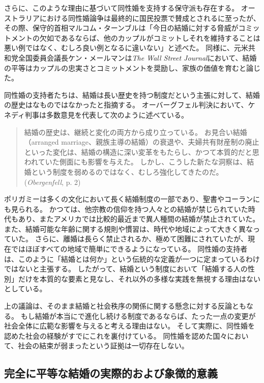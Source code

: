 \documentclass[paper=a4,book,openany]{jlreq} \usepackage{mystyle}
\begin{document}
さらに、このような理由に基づいて同性婚を支持する保守派も存在する。
オーストラリアにおける同性婚論争は最終的に国民投票で賛成とされるに至ったが、その際、保守的首相マルコム・ターンブルは「今日の結婚に対する脅威がコミットメントの欠如であるならば、他のカップルがコミットしそれを維持することは悪い例ではなく、むしろ良い例となるに違いない」と述べた\citep{gartrell17:_malcol_turnb_makes_conser_case}。
同様に、元米共和党全国委員会議長ケン・メールマンは\emph{The Wall Street Journal}において、結婚の平等はカップルの忠実さとコミットメントを奨励し、家族の価値を育むと論じた\citep{mehlman12:_makin_same_sex_case}。

同性婚の支持者たちは、結婚は長い歴史を持つ制度だという主張に対して、結婚の歴史はなものではなかったと指摘する。
オーバーグフェル判決において、ケネディ判事は多数意見を代表して次のように述べている。

\begin{quote}
結婚の歴史は、継続と変化の両方から成り立っている。
お見合い結婚（arranged marriage、親族主導の結婚）の衰退や、夫婦共有財産制の廃止といった変化は、結婚の構造に深い変革をもたらし、かつて本質的だと思われていた側面にも影響を与えた。
しかし、こうした新たな洞察は、結婚という制度を弱めるのではなく、むしろ強化してきたのだ。
(\emph{Obergenfell}, p. 2)
\end{quote}

ポリガミーは多くの文化において長く結婚制度の一部であり、聖書やコーランにも見られる。
かつては、他宗教の信仰を持つ人々との結婚が禁じられていた時代もあり、またアメリカでは比較的最近まで異人種間の結婚が禁止されていた。
また、結婚可能な年齢に関する規則や慣習は、時代や地域によって大きく異なっていた。
さらに、離婚は長らく禁止されるか、極めて困難にされていたが、現在ではほぼすべての地域で簡単にできるようになっている。
同性婚の支持者は、このように「結婚とは何か」という伝統的な定義が一つに定まっているわけではないと主張する。
したがって、結婚という制度において「結婚する人の性別」だけを本質的な要素と見なし、それ以外の多様な実践を無視する理由はないとしている。

上の議論は、そのまま結婚と社会秩序の関係に関する懸念に対する反論ともなる。
もし結婚が本当にで進化し続ける制度であるならば、たった一点の変更が社会全体に広範な影響を与えると考える理由はない。
そして実際に、同性婚を認めた社会の経験がすでにこれを裏付けている。
同性婚を認めた国々において、社会の結束が弱まったという証拠は一切存在しない。

\subsection{完全に平等な結婚の実際的および象徴的意義}
\end{document}

